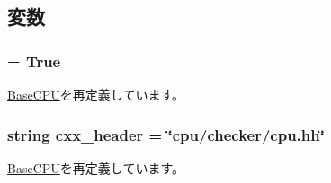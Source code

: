 \subsection{変数}
\hypertarget{classCheckerCPU_1_1CheckerCPU_a17fa61ac3806b481cafee5593b55e5d0}{
\subsubsection[{abstract}]{ = True}}
\label{classCheckerCPU_1_1CheckerCPU_a17fa61ac3806b481cafee5593b55e5d0}


\hyperlink{classBaseCPU_1_1BaseCPU_a17fa61ac3806b481cafee5593b55e5d0}{BaseCPU}を再定義しています。\hypertarget{classCheckerCPU_1_1CheckerCPU_a17da7064bc5c518791f0c891eff05fda}{
\subsubsection[{cxx\_\-header}]{\setlength{\rightskip}{0pt plus 5cm}string {\bf cxx\_\-header} = \char`\"{}cpu/{\bf checker}/cpu.hh\char`\"{}}}
\label{classCheckerCPU_1_1CheckerCPU_a17da7064bc5c518791f0c891eff05fda}


\hyperlink{classBaseCPU_1_1BaseCPU_a17da7064bc5c518791f0c891eff05fda}{BaseCPU}を再定義しています。


